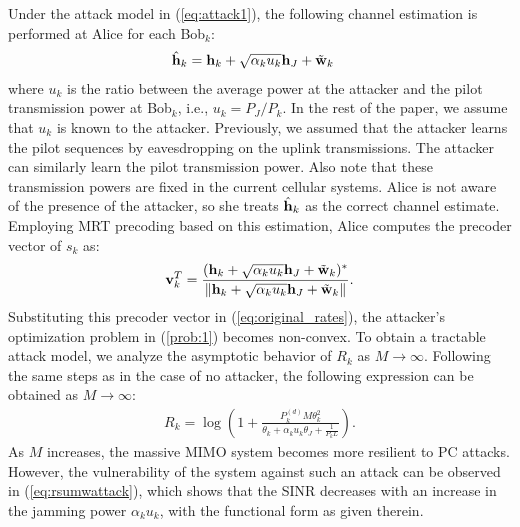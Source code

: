 \documentclass[draftclsnofoot, 12pt, onecolumn, journal]{IEEEtran}
\newcommand{\hv}{{\bf h}}
\newcommand{\wv}{{\bf w}}
\newcommand{\vv}{{\bf v}}
\begin{document}
Under the attack model in (\ref{eq:attack1}), the following channel estimation is performed at Alice for each Bob$_k$:
%
\begin{align}
\hat{\hv}_k &= \hv_k + \sqrt{ \alpha_k u_k } \hv_J + \tilde{\wv}_k
\end{align}
%
where $u_k $ is the ratio between the average power at the attacker and the pilot transmission power at Bob$_k$, i.e., $u_k = P_J / P_k $.
In the rest of the paper, we assume that $u_k$ is known to the attacker.
Previously, we assumed that the attacker learns the pilot sequences by eavesdropping on the uplink transmissions.
The attacker can similarly learn the pilot transmission power.
Also note that these transmission powers are fixed in the current cellular systems.
Alice is not aware of the presence of the attacker, so she treats $\hat{\hv}_k$ as the correct channel estimate.
Employing MRT precoding based on this estimation, Alice computes the precoder vector of $s_k$ as:
%
\begin{align}
\vv_k^T = \frac{( \hv_k + \sqrt{\alpha_k u_k}\hv_J + \tilde{\wv}_k )^*}{ \Vert \hv_k + \sqrt{ \alpha_k u_k }\hv_J + \tilde{\wv}_k \Vert }.
\end{align}
%
Substituting this precoder vector in (\ref{eq:original_rates}), the attacker's optimization problem in (\ref{prob:1}) becomes non-convex. 
To obtain a tractable attack model, we analyze the asymptotic behavior of $R_k$ as $M \rightarrow \infty $.
Following the same steps as in the case of no attacker, the following expression can be obtained as $M \rightarrow \infty$:
%
\begin{align}
R_k = \log \left( 1 + \frac{P_k^{(d)} M \theta_k^2}{\theta_k + \alpha_k u_k \theta_J + \frac{1}{P_k L}} \right).
\label{eq:rsumwattack}
\end{align}
%
As $M$ increases, the massive MIMO system becomes more resilient to PC attacks.
However, the vulnerability of the system against such an attack can be observed in (\ref{eq:rsumwattack}), which shows that the SINR decreases with an increase in the jamming power $\alpha_k u_k$, with the functional form as given therein.
\end{document}
